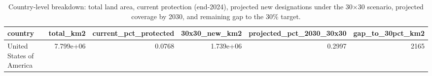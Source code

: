 \begin{table}
\caption{Country-level breakdown: total land area, current protection (end-2024), projected new designations under the 30×30 scenario, projected coverage by 2030, and remaining gap to the 30\% target.}
\label{tab:forward_country}
\begin{tabular}{lrrrrr}
\toprule
country & total_km2 & current_pct_protected & 30x30_new_km2 & projected_pct_2030_30x30 & gap_to_30pct_km2 \\
\midrule
United States of America & 7.799e+06 & 0.0768 & 1.739e+06 & 0.2997 & 2165 \\
\bottomrule
\end{tabular}
\end{table}
